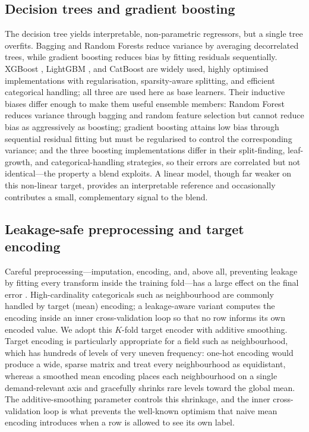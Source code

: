 \documentclass[review,12pt]{elsarticle}
\begin{document}
\subsection{Decision trees and gradient boosting}
The decision tree \citep{quinlan1986} yields interpretable, non-parametric
regressors, but a single tree overfits. Bagging \citep{breiman1996} and Random
Forests \citep{breiman2001} reduce variance by averaging decorrelated trees, while
gradient boosting \citep{friedman2001} reduces bias by fitting residuals
sequentially. XGBoost \citep{chen2016xgboost}, LightGBM \citep{ke2017lightgbm}, and
CatBoost \citep{prokhorenkova2018catboost} are widely used, highly optimised
implementations with regularisation, sparsity-aware splitting, and efficient
categorical handling; all three are used here as base learners. Their inductive biases differ enough to
make them useful ensemble members: Random Forest reduces variance through bagging
and random feature selection but cannot reduce bias as aggressively as boosting;
gradient boosting attains low bias through sequential residual fitting but must be
regularised to control the corresponding variance; and the three boosting
implementations differ in their split-finding, leaf-growth, and categorical-handling
strategies, so their errors are correlated but not identical---the property a blend
exploits. A linear model, though far weaker on this non-linear target, provides an
interpretable reference and occasionally contributes a small, complementary signal
to the blend.

\subsection{Leakage-safe preprocessing and target encoding}
Careful preprocessing---imputation, encoding, and, above all, preventing leakage
by fitting every transform inside the training fold---has a large effect on the
final error \citep{pedregosa2011sklearn}. High-cardinality categoricals such as
neighbourhood are commonly handled by target (mean) encoding; a leakage-aware
variant computes the encoding inside an inner cross-validation loop so that no row
informs its own encoded value. We adopt this $K$-fold target encoder with additive
smoothing. Target encoding is particularly appropriate for a field such as
neighbourhood, which has hundreds of levels of very uneven frequency: one-hot
encoding would produce a wide, sparse matrix and treat every neighbourhood as
equidistant, whereas a smoothed mean encoding places each neighbourhood on a single
demand-relevant axis and gracefully shrinks rare levels toward the global mean. The
additive-smoothing parameter controls this shrinkage, and the inner
cross-validation loop is what prevents the well-known optimism that naive mean
encoding introduces when a row is allowed to see its own label.
\end{document}
